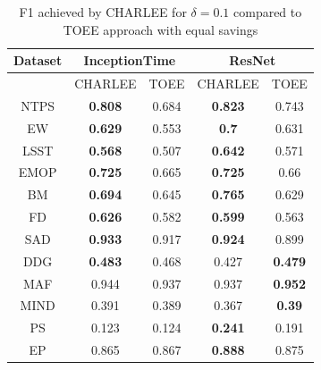 \documentclass[conference]{IEEEtran}
\begin{document}
\begin{table}[tp]
\caption{F1 achieved by CHARLEE for $\delta=0.1$ compared to TOEE approach with equal savings}\label{table:ef1}
\begin{center}
\begin{tabular}{|c|cc|cc|}
\hline
Dataset & \multicolumn{2}{c|}{InceptionTime}                   & \multicolumn{2}{c|}{ResNet}                          \\ \hline
        & \multicolumn{1}{c|}{CHARLEE}        & TOEE             & \multicolumn{1}{c|}{CHARLEE}        & TOEE             \\ \hline
NTPS    & \multicolumn{1}{c|}{\textbf{0.808}} & 0.684          & \multicolumn{1}{c|}{\textbf{0.823}} & 0.743          \\ \hline
EW      & \multicolumn{1}{c|}{\textbf{0.629}} & 0.553          & \multicolumn{1}{c|}{\textbf{0.7}}   & 0.631          \\ \hline
LSST    & \multicolumn{1}{c|}{\textbf{0.568}} & 0.507          & \multicolumn{1}{c|}{\textbf{0.642}} & 0.571          \\ \hline
EMOP    & \multicolumn{1}{c|}{\textbf{0.725}} & 0.665          & \multicolumn{1}{c|}{\textbf{0.725}} & 0.66           \\ \hline
BM      & \multicolumn{1}{c|}{\textbf{0.694}} & 0.645          & \multicolumn{1}{c|}{\textbf{0.765}} & 0.629          \\ \hline
FD      & \multicolumn{1}{c|}{\textbf{0.626}} & 0.582          & \multicolumn{1}{c|}{\textbf{0.599}} & 0.563          \\ \hline
SAD     & \multicolumn{1}{c|}{\textbf{0.933}} & 0.917          & \multicolumn{1}{c|}{\textbf{0.924}} & 0.899          \\ \hline
DDG     & \multicolumn{1}{c|}{\textbf{0.483}} & 0.468          & \multicolumn{1}{c|}{0.427}          & \textbf{0.479} \\ \hline
MAF     & \multicolumn{1}{c|}{0.944}          & 0.937          & \multicolumn{1}{c|}{0.937}          & \textbf{0.952} \\ \hline
MIND    & \multicolumn{1}{c|}{0.391}          & 0.389          & \multicolumn{1}{c|}{0.367}          & \textbf{0.39}  \\ \hline
PS      & \multicolumn{1}{c|}{0.123}          & 0.124          & \multicolumn{1}{c|}{\textbf{0.241}} & 0.191          \\ \hline
EP      & \multicolumn{1}{c|}{0.865}          & 0.867          & \multicolumn{1}{c|}{\textbf{0.888}} & 0.875          \\ \hline

\end{tabular}
\end{center}
\end{table}
\end{document}
